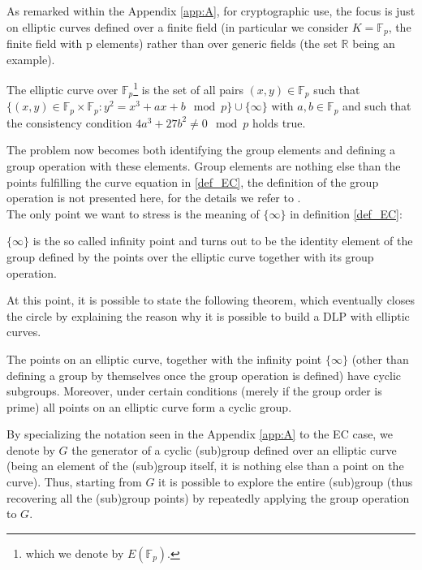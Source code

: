 As remarked within the Appendix \ref{app:A}, for cryptographic use, the focus is just on elliptic curves defined over a finite field (in particular we consider $K = \mathbb{F}_p$, the finite field with p elements) rather than over generic fields (the set $\mathbb{R}$ being an example).
\begin{mydef}
\label{def_EC}
    The elliptic curve over $\mathbb{F}_p$\footnote{which we denote by $E(\mathbb{F}_p)$.} is the set of all pairs $(x,y) \in \mathbb{F}_p$ such that $\{(x,y) \in \mathbb{F}_p \times \mathbb{F}_p: y^2 = x^3 + ax+b \mod p\} \cup \{\infty\}$ with $a,b \in \mathbb{F}_p$ and such that the consistency condition $4 a^3+27b^2 \neq 0 \mod{p}$ holds true.
\end{mydef}
\noindent
The problem now becomes both identifying the group elements and defining a group operation with these elements. Group elements are nothing else than the points fulfilling the curve equation in \ref{def_EC}, the definition of the group operation is not presented here, for the details we refer to \cite{UnderstandingCrypto}.\\
The only point we want to stress is the meaning of $\{\infty \}$ in definition \ref{def_EC}:
\begin{myrem}
    $\{\infty \}$ is the so called infinity point and turns out to be the identity element of the group defined by the points over the elliptic curve together with its group operation.
\end{myrem}
\noindent
At this point, it is possible to state the following theorem, which eventually closes the circle by explaining the reason why it is possible to build a DLP with elliptic curves.
\begin{mytheorem}
    The points on an elliptic curve, together with the infinity point $\{\infty \}$ (other than defining a group by themselves once the group operation is defined) have cyclic subgroups. Moreover, under certain conditions (merely if the group order is prime) all points on an elliptic curve form a cyclic group.
\end{mytheorem}
\begin{myrem}
    By specializing the notation seen in the Appendix \ref{app:A} to the EC case, we denote by $G$ the generator of a cyclic (sub)group defined over an elliptic curve (being an element of the (sub)group itself, it is nothing else than a point on the curve). Thus, starting from $G$ it is possible to explore the entire (sub)group (thus recovering all the (sub)group points) by repeatedly applying the group operation to $G$.
\end{myrem}
